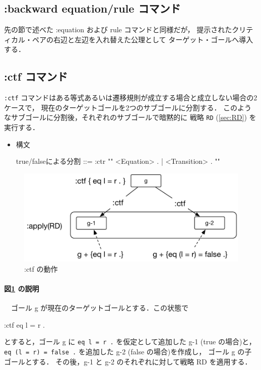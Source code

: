 \documentclass[a4paper,oneside,10pt,here]{memoir}
\newenvironment{vvtm}%
{\parskip=0pt\lineskip=0pt\begin{center}\begin{minipage}{0.8\textwidth}\begin{snugshade}}%
  {\end{snugshade}\end{minipage}\end{center}}
\begin{document}
\subsection{:backward equation/rule コマンド}
先の節で述べた :equation および rule コマンドと同様だが，
提示されたクリティカル・ペアの右辺と左辺を入れ替えた公理として
ターゲット・ゴールへ導入する．

\subsection{:ctf コマンド}\label{sec:ctf}
\texttt{:ctf} コマンドはある等式あるいは遷移規則が成立する場合と成立しない場合の2ケースで，
現在のターゲットゴールを2つのサブゴールに分割する．
このようなサブゴールに分割後，それぞれのサブゴールで暗黙的に
戦略 \texttt{RD} (\ref{sec:RD}) を実行する．
\begin{itemize}
\item 構文
  \begin{vvtm}
    \begin{simplev}
      true/falseによる分割 ::= :ctr "{" { <Equation> . | <Transition> . } "}"
    \end{simplev}
  \end{vvtm}
\end{itemize}

\begin{figure}[hbt]
  \centering
  \includegraphics[scale=0.6]{ctf.pdf}
  \caption{:ctf の動作}
  \label{fig:ctf}
\end{figure}
\paragraph{図\ref{fig:ctf} の説明}
　ゴール g が現在のターゲットゴールとする．この状態で
  \begin{simplev}
    :ctf {eq l = r . }
  \end{simplev}
  とすると，ゴール g に \texttt{eq l = r .} を仮定として追加した g-1 (true の場合)と，
  \texttt{eq (l = r) = false .} を追加した g-2 (false の場合)を作成し，
  ゴール g の子ゴールとする．
  その後，g-1 と g-2 のそれぞれに対して戦略 RD を適用する．
\end{document}
